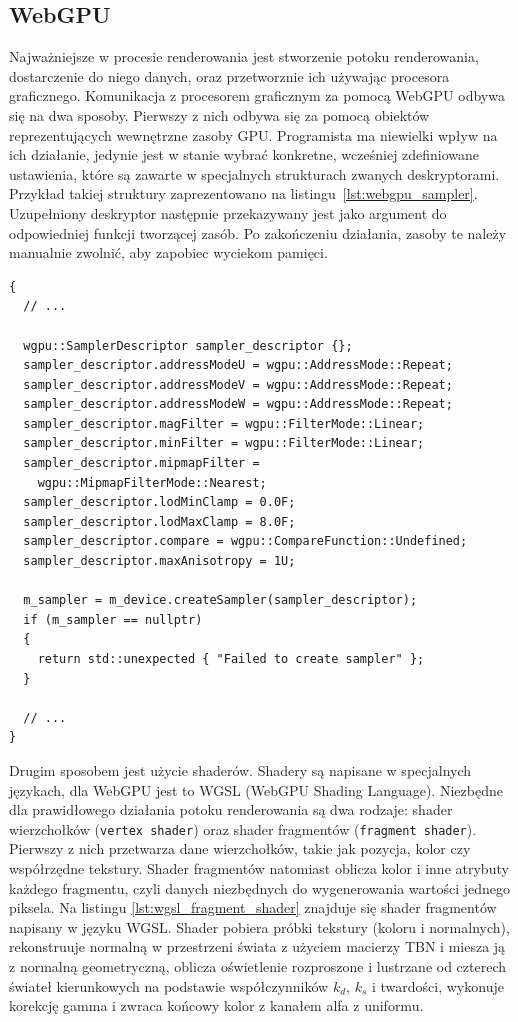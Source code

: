 \subsection{WebGPU}
Najważniejsze w procesie renderowania jest stworzenie potoku renderowania, dostarczenie do niego danych, oraz przetworznie ich używając procesora graficznego. Komunikacja z procesorem graficznym za pomocą WebGPU odbywa się na dwa sposoby. Pierwszy z nich odbywa się za pomocą obiektów reprezentujących wewnętrzne zasoby GPU. Programista ma niewielki wpływ na ich działanie, jedynie jest w stanie wybrać konkretne, wcześniej zdefiniowane ustawienia, które są zawarte w specjalnych strukturach zwanych deskryptorami. Przykład takiej struktury zaprezentowano na listingu~\ref{lst:webgpu_sampler}. Uzupełniony deskryptor następnie przekazywany jest jako argument do odpowiedniej funkcji tworzącej zasób. Po zakończeniu działania, zasoby te należy manualnie zwolnić, aby zapobiec wyciekom pamięci.
\begin{lstlisting}[caption=Deskrytor obiektu \texttt{WGPUSampler}\, oraz przekazanie go do funkcji, label=lst:webgpu_sampler]
{
  // ...

  wgpu::SamplerDescriptor sampler_descriptor {};
  sampler_descriptor.addressModeU = wgpu::AddressMode::Repeat;
  sampler_descriptor.addressModeV = wgpu::AddressMode::Repeat;
  sampler_descriptor.addressModeW = wgpu::AddressMode::Repeat;
  sampler_descriptor.magFilter = wgpu::FilterMode::Linear;
  sampler_descriptor.minFilter = wgpu::FilterMode::Linear;
  sampler_descriptor.mipmapFilter =
    wgpu::MipmapFilterMode::Nearest;
  sampler_descriptor.lodMinClamp = 0.0F;
  sampler_descriptor.lodMaxClamp = 8.0F;
  sampler_descriptor.compare = wgpu::CompareFunction::Undefined;
  sampler_descriptor.maxAnisotropy = 1U;

  m_sampler = m_device.createSampler(sampler_descriptor);
  if (m_sampler == nullptr)
  {
    return std::unexpected { "Failed to create sampler" };
  }

  // ...
}
\end{lstlisting}
Drugim sposobem jest użycie shaderów. Shadery są napisane w specjalnych językach, dla WebGPU jest to WGSL (WebGPU Shading Language). Niezbędne dla prawidłowego działania potoku renderowania są dwa rodzaje: shader wierzchołków (\texttt{vertex shader}) oraz shader fragmentów (\texttt{fragment shader}). Pierwszy z nich przetwarza dane wierzchołków, takie jak pozycja, kolor czy współrzędne tekstury. Shader fragmentów natomiast oblicza kolor i inne atrybuty każdego fragmentu, czyli danych niezbędnych do wygenerowania wartości jednego piksela. Na listingu \ref{lst:wgsl_fragment_shader} znajduje się shader fragmentów napisany w języku WGSL. Shader pobiera próbki tekstury (koloru i normalnych), rekonstruuje normalną w przestrzeni świata z użyciem macierzy TBN i miesza ją z normalną geometryczną, oblicza oświetlenie rozproszone i lustrzane od czterech świateł kierunkowych na podstawie współczynników \(k_d\), \(k_s\) i twardości, wykonuje korekcję gamma i zwraca końcowy kolor z kanałem alfa z uniformu.
